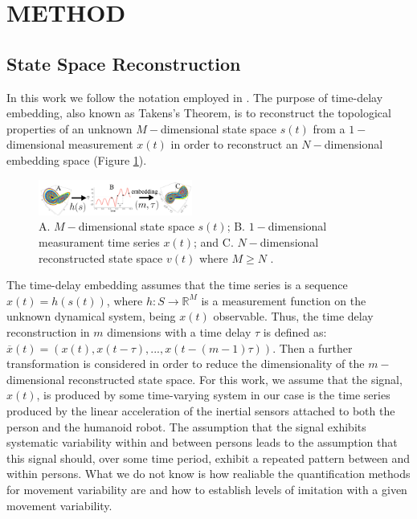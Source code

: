 \documentclass{sigchi}
\begin{document}

\section{METHOD}

\subsection{State Space Reconstruction}
In this work we follow the notation employed in \cite{Uzal2011}.
The purpose of time-delay embedding, also known as Takens's Theorem,
is to reconstruct the topological properties of an unknown $M-$dimensional
state space $s(t)$ from a $1-$dimensional measurement $x(t)$ in order to
reconstruct an $N-$dimensional embedding space (Figure \ref{fig:takens_theorem}).
\begin{figure}[!htb]
\centering
\includegraphics[width=0.45\textwidth]{figures/reconstructed_state_space/fig}
\caption[PA]{A. $M-$dimensional state space $s(t)$; B. $1-$dimensional measurament
time series $x(t)$; and  C. $N-$dimensional reconstructed state space $v(t)$ where $M \geq N$
\cite{QuintanaDuque2012}.}
\label{fig:takens_theorem}
\end{figure}
The time-delay embedding assumes that the time series is a sequence $x(t)=h(s(t))$,
where $h: S \rightarrow \mathbb{R}^M$ is a measurement function on the unknown
dynamical system, being $x(t)$ observable.
Thus, the time delay reconstruction in $m$ dimensions with a time delay
$\tau$ is defined as: $\overline{x}(t) = (x(t), x(t-\tau),...,x(t-(m-1)\tau))$.
Then a further transformation is considered in order to reduce
the dimensionality of the $m-$dimensional reconstructed state space.
For this work, we assume that the signal, $x(t)$, is produced by some time-varying
system in our case is the time series produced by the linear acceleration of
the inertial sensors attached to both the person and the humanoid robot.
The assumption that the signal exhibits systematic variability within and between
persons leads to the assumption that this signal should, over some time period,
exhibit a repeated pattern between and within persons. What we do not know is
how realiable the quantification methods for movement variability are and how
to establish levels of imitation with a given movement variability.
\end{document}
